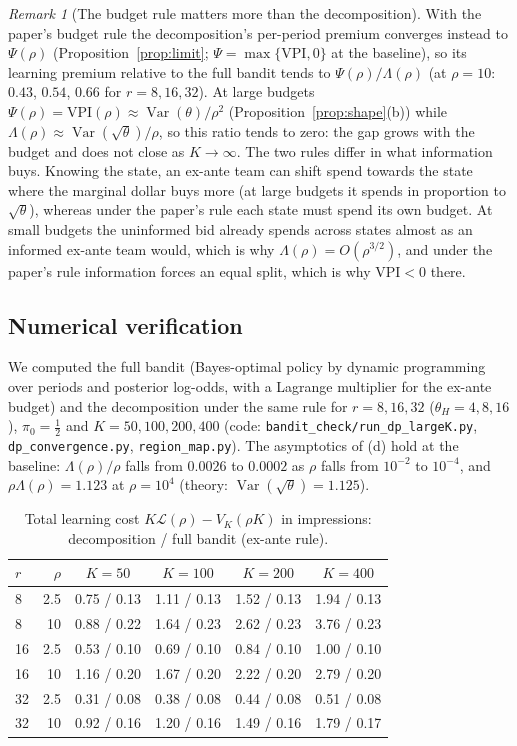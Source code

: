 \documentclass[11pt]{article}
\theoremstyle{definition}
\theoremstyle{remark}
\newtheorem{remark}{Remark}
\newcommand{\VPI}{\mathrm{VPI}}
\DeclareMathOperator{\Var}{Var}
\begin{document}
\begin{remark}[The budget rule matters more than the decomposition]
With the paper's budget rule the decomposition's per-period premium converges instead to $\Psi(\rho)$
(Proposition~\ref{prop:limit}; $\Psi=\max\{\VPI,0\}$ at the baseline), so its learning premium relative to the full
bandit tends to $\Psi(\rho)/\Lambda(\rho)$ (at $\rho=10$: $0.43$, $0.54$, $0.66$ for $r=8,16,32$). At large budgets
$\Psi(\rho)=\VPI(\rho)\approx\Var(\theta)/\rho^2$ (Proposition~\ref{prop:shape}(b)) while $\Lambda(\rho)\approx\Var(\sqrt\theta)/\rho$,
so this ratio tends to zero: the gap grows with the budget and does not close as $K\to\infty$. The two rules differ in what information
buys. Knowing the state, an ex-ante team can shift spend towards the state where the marginal dollar buys more
(at large budgets it spends in proportion to $\sqrt\theta$), whereas under the paper's rule each state must spend its own
budget. At small budgets the uninformed bid already spends across states almost as an informed ex-ante team would,
which is why $\Lambda(\rho)=O(\rho^{3/2})$, and under the paper's rule information forces an equal split, which is why
$\VPI<0$ there.
\end{remark}

\subsection{Numerical verification}

We computed the full bandit (Bayes-optimal policy by dynamic programming over periods and posterior log-odds, with a
Lagrange multiplier for the ex-ante budget) and the decomposition under the same rule for $r=8,16,32$
($\theta_H=4,8,16$), $\pi_0=\tfrac12$ and $K=50,100,200,400$ (code: \texttt{bandit\_check/run\_dp\_largeK.py},
\texttt{dp\_convergence.py}, \texttt{region\_map.py}). The asymptotics of (d) hold at the baseline: $\Lambda(\rho)/\rho$ falls
from $0.0026$ to $0.0002$ as $\rho$ falls from $10^{-2}$ to $10^{-4}$, and $\rho\Lambda(\rho)=1.123$ at $\rho=10^4$
(theory: $\Var(\sqrt\theta)=1.125$).

\begin{table}[h]
\centering\small
\caption{Total learning cost $K\mathcal L(\rho)-V_K(\rho K)$ in impressions: decomposition / full bandit (ex-ante rule).}
\label{tab:common}
\begin{tabular}{@{}lrcccc@{}}
\toprule
$r$ & $\rho$ & $K=50$ & $K=100$ & $K=200$ & $K=400$\\
\midrule
8  & 2.5 & 0.75 / 0.13 & 1.11 / 0.13 & 1.52 / 0.13 & 1.94 / 0.13\\
8  & 10  & 0.88 / 0.22 & 1.64 / 0.23 & 2.62 / 0.23 & 3.76 / 0.23\\
16 & 2.5 & 0.53 / 0.10 & 0.69 / 0.10 & 0.84 / 0.10 & 1.00 / 0.10\\
16 & 10  & 1.16 / 0.20 & 1.67 / 0.20 & 2.22 / 0.20 & 2.79 / 0.20\\
32 & 2.5 & 0.31 / 0.08 & 0.38 / 0.08 & 0.44 / 0.08 & 0.51 / 0.08\\
32 & 10  & 0.92 / 0.16 & 1.20 / 0.16 & 1.49 / 0.16 & 1.79 / 0.17\\
\bottomrule
\end{tabular}
\end{table}
\end{document}
